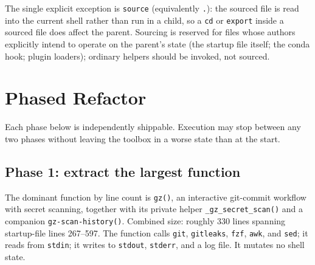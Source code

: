 \documentclass[11pt,letterpaper]{scrartcl}
\begin{document}
The single explicit exception is \texttt{source} (equivalently
\texttt{.}): the sourced file is read into the current shell rather
than run in a child, so a \texttt{cd} or \texttt{export} inside a
sourced file does affect the parent. Sourcing is reserved for
files whose authors explicitly intend to operate on the parent's
state (the startup file itself; the conda hook; plugin loaders);
ordinary helpers should be invoked, not sourced.

\section{Phased Refactor}

Each phase below is independently shippable. Execution may stop
between any two phases without leaving the toolbox in a worse
state than at the start.

\subsection{Phase 1: extract the largest function}

The dominant function by line count is \texttt{gz()}, an
interactive git-commit workflow with secret scanning, together
with its private helper \texttt{\_gz\_secret\_scan()} and a
companion \texttt{gz-scan-history()}. Combined size: roughly 330
lines spanning startup-file lines 267--597. The function calls
\texttt{git}, \texttt{gitleaks}, \texttt{fzf}, \texttt{awk}, and
\texttt{sed}; it reads from \texttt{stdin}; it writes to
\texttt{stdout}, \texttt{stderr}, and a log file. It mutates no
shell state.
\end{document}
